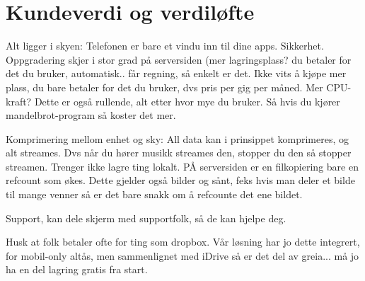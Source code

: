 \section{Kundeverdi og verdiløfte}

Alt ligger i skyen: Telefonen er bare et vindu inn til dine apps.
Sikkerhet. Oppgradering skjer i stor grad på serversiden (mer lagringsplass? du
betaler for det du bruker, automatisk.. får regning, så enkelt er det. Ikke
vits å kjøpe mer plass, du bare betaler for det du bruker, dvs pris per gig per
måned. Mer CPU-kraft? Dette er også rullende, alt etter hvor mye du bruker. Så
hvis du kjører mandelbrot-program så koster det mer.

Komprimering mellom enhet og sky: All data kan i prinsippet komprimeres, og alt
streames. Dvs når du hører musikk streames den, stopper du den så stopper
streamen. Trenger ikke lagre ting lokalt. PÅ serversiden er en filkopiering
bare en refcount som økes. Dette gjelder også bilder og sånt, feks hvis man
deler et bilde til mange venner så er det bare snakk om å refcounte det ene
bildet.

Support, kan dele skjerm med supportfolk, så de kan hjelpe deg.

Husk at folk betaler ofte for ting som dropbox. Vår løsning har jo dette
integrert, for mobil-only altås, men sammenlignet med iDrive så er det del av
greia... må jo ha en del lagring gratis fra start.
